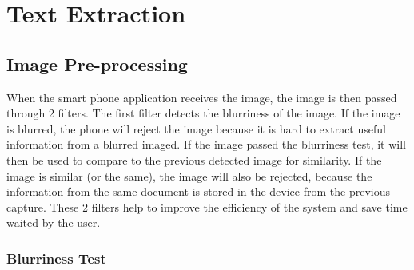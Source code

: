 \section{Text Extraction}

\subsection{Image Pre-processing}
When the smart phone application receives the image, the image is then passed through 2 filters. The first filter detects the blurriness of the image. If the image is blurred, the phone will reject the image because it is hard to extract useful information from a blurred imaged. If the image passed the blurriness test, it will then be used to compare to the previous detected image for similarity. If the image is similar (or the same), the image will also be rejected, because the information from the same document is stored in the device from the previous capture. These 2 filters help to improve the efficiency of the system and save time waited by the user.

\subsubsection{Blurriness Test}

